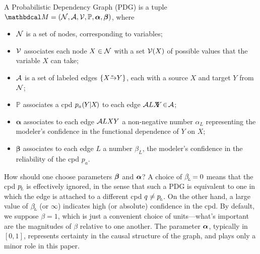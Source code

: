 \begin{defn}
    \label{defn:pdg}
	A Probabilistic Dependency Graph (PDG)
	is a tuple $\dg M = (\N,\Ar,\V,\mathbb P, \balpha, \bbeta)$, where
    \begin{itemize}[leftmargin=1.5em, itemsep=0pt]
        \item $\mathcal N$
			is a set of nodes, corresponding to variables;
		\item $\mathcal V$
			associates each node $X \in \mathcal N$ with a set $\mathcal V(X)$ of possible values that the variable $X$ can take;
   		\item $\mathcal A$
			is a set of labeled  edges $\{ \ed aXY \}$, each with a source
			$X$ and target $Y$ from $\mathcal N$;
        \item $\mathbb P$
		associates
        a cpd $p_a(\mskip-1muY\mskip-1mu|\mskip-1muX\mskip-2mu)$
        to each edge $\mathcal A L{X\!\!}{\!Y} \!\in\! \mathcal A$;
		\item $\boldsymbol\alpha$
		associates to each edge $\mathcal A L{X}{Y}$ a non-negative number $\alpha_L$
	    representing
	    the modeler's confidence in the functional dependence of $Y$ on $X$;

		\item $\boldsymbol\beta$
		associates to each edge $L$ a number $\beta_L$,
		the modeler's confidence in the reliability of
		the cpd
		$p_a$.%
	    \qedhere
    \end{itemize}%
\end{defn}

How should one choose parameters $\boldsymbol\beta$ and $\boldsymbol\alpha$?
A choice of $\beta_{\!_{L}\!}=0$ means that the cpd $p_{\!_{L}\!}$ is effectively ignored, in the sense that such a PDG is equivalent to one in which the edge is attached to a different cpd $q \ne p_{\!_{L}\!}$.
On the other hand, a large value of $\beta_{\!_{L}\!}$ (or $\infty$) indicates high (or absolute) confidence in the cpd. By default, we suppose $\beta\!=\! 1$, which is just a convenient choice of units---what’s important are the magnitudes of $\beta$ relative to one another.
The parameter $\boldsymbol\alpha$, typically in $[0,1]$, represents certainty in the causal structure of the graph, and plays only a minor role in this paper.



